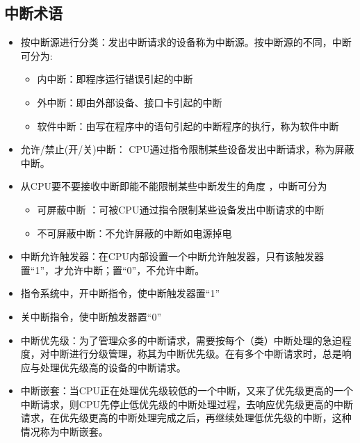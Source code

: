\documentclass[a4paper, 11pt]{article} %
\begin{document}
\subsection{中断术语} \cite{intprocess}
\begin{itemize}
  \item 按中断源进行分类：发出中断请求的设备称为中断源。按中断源的不同，中断可分为:
    \begin{itemize} 
    \item 内中断：即程序运行错误引起的中断
    \item 外中断：即由外部设备、接口卡引起的中断
    \item 软件中断：由写在程序中的语句引起的中断程序的执行，称为软件中断
    \end{itemize}
  \item 允许/禁止(开/关)中断： CPU通过指令限制某些设备发出中断请求，称为屏蔽中断。
  \item 从CPU要不要接收中断即能不能限制某些中断发生的角度 ，中断可分为
  \begin{itemize} 
    \item 可屏蔽中断 ：可被CPU通过指令限制某些设备发出中断请求的中断
    \item 不可屏蔽中断：不允许屏蔽的中断如电源掉电
  \end{itemize}
  \item 中断允许触发器：在CPU内部设置一个中断允许触发器，只有该触发器置“1”，才允许中断；置“0”，不允许中断。
  \item 指令系统中，开中断指令，使中断触发器置“1”
  \item 关中断指令，使中断触发器置“0”
  \item 中断优先级：为了管理众多的中断请求，需要按每个（类）中断处理的急迫程度，对中断进行分级管理，称其为中断优先级。在有多个中断请求时，总是响应与处理优先级高的设备的中断请求。
  \item 中断嵌套：当CPU正在处理优先级较低的一个中断，又来了优先级更高的一个中断请求，则CPU先停止低优先级的中断处理过程，去响应优先级更高的中断请求，在优先级更高的中断处理完成之后，再继续处理低优先级的中断，这种情况称为中断嵌套。
\end{itemize}
\end{document}

